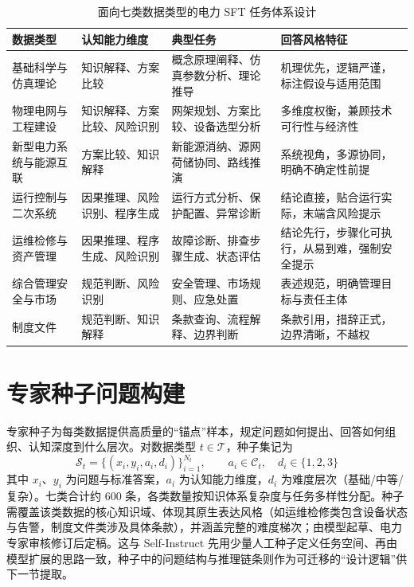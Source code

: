 \documentclass[fontset=fandol,type=master,campus=shenzhen,etitleauto=true]{hithesisbook}
\begin{document}
\begin{table}[htbp]
\centering
\caption{面向七类数据类型的电力 SFT 任务体系设计}
\label{tab:sft-task-design}
\small
\renewcommand{\arraystretch}{1.05}
\begin{tabular}{p{2.2cm}p{2.2cm}p{3.2cm}p{3.6cm}}
\toprule
\textbf{数据类型} & \textbf{认知能力维度} & \textbf{典型任务} & \textbf{回答风格特征} \\
\midrule
基础科学与仿真理论 & 知识解释、方案比较 & 概念原理阐释、仿真参数分析、理论推导 & 机理优先，逻辑严谨，标注假设与适用范围 \\
\midrule
物理电网与工程建设 & 知识解释、方案比较、风险识别 & 网架规划、方案比较、设备选型分析 & 多维度权衡，兼顾技术可行性与经济性 \\
\midrule
新型电力系统与能源互联 & 方案比较、知识解释 & 新能源消纳、源网荷储协同、路线推演 & 系统视角，多源协同，明确不确定性前提 \\
\midrule
运行控制与二次系统 & 因果推理、风险识别、程序生成 & 运行方式分析、保护配置、异常诊断 & 结论直接，贴合运行实际，末端含风险提示 \\
\midrule
运维检修与资产管理 & 因果推理、程序生成、风险识别 & 故障诊断、排查步骤生成、状态评估 & 结论先行，步骤化可执行，从易到难，强制安全提示 \\
\midrule
综合管理安全与市场 & 规范判断、风险识别 & 安全管理、市场规则、应急处置 & 表述规范，明确管理目标与责任主体 \\
\midrule
制度文件 & 规范判断、知识解释 & 条款查询、流程解释、边界判断 & 条款引用，措辞正式，边界清晰，不越权 \\
\bottomrule
\end{tabular}
\end{table}

\section{专家种子问题构建}\label{ux4e13ux5bb6ux79cdux5b50ux95eeux9898ux6784ux5efa}

专家种子为每类数据提供高质量的“锚点”样本，规定问题如何提出、回答如何组织、认知深度到什么层次。对数据类型 $t \in \mathcal{T}$，种子集记为
\begin{equation}
\mathcal{S}_t = \{(x_i, y_i, a_i, d_i)\}_{i=1}^{N_t}, \qquad a_i \in \mathcal{C}_t, \quad d_i \in \{1, 2, 3\}
\end{equation}
其中 $x_i$、$y_i$ 为问题与标准答案，$a_i$ 为认知能力维度，$d_i$ 为难度层次（基础/中等/复杂）。七类合计约 600 条，各类数量按知识体系复杂度与任务多样性分配。种子需覆盖该类数据的核心知识域、体现其原生表达风格（如运维检修类包含设备状态与告警，制度文件类涉及具体条款），并涵盖完整的难度梯次；由模型起草、电力专家审核修订后定稿。这与 Self-Instruct 先用少量人工种子定义任务空间、再由模型扩展的思路一致\cite{ref24}，种子中的问题结构与推理链条则作为可迁移的“设计逻辑”\cite{ref54}供下一节提取。
\end{document}
